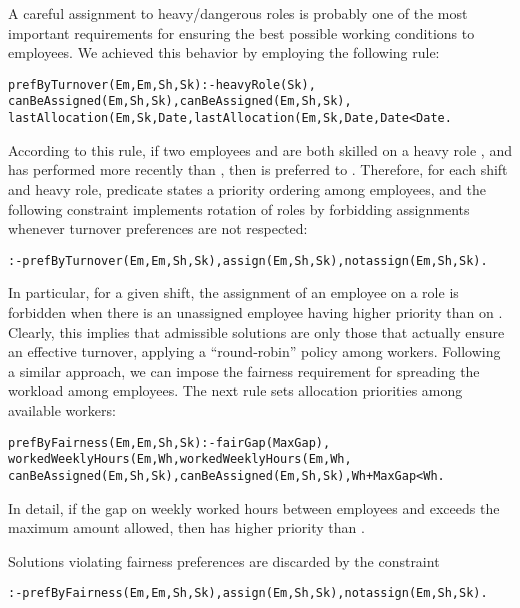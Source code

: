 \documentclass{tlp}
\begin{document}
A careful assignment to heavy/dangerous roles is probably one of the most important
requirements for ensuring the best possible working conditions to employees.
We achieved this behavior by employing the following rule:
\begin{alltt}\small
 prefByTurnover(Em,Em,Sh,Sk) :- heavyRole(Sk),
    canBeAssigned(Em,Sh,Sk), canBeAssigned(Em,Sh,Sk),
    lastAllocation(Em,Sk,Date, lastAllocation(Em,Sk,Date, Date < Date.
\end{alltt}\normalsize
According to this rule, if two employees  and  are both skilled
on a heavy role ,
and  has performed  more recently than ,
then  is preferred to .
Therefore, for each shift and heavy role, predicate  states a priority ordering
among employees, and the following constraint implements rotation of roles
by forbidding assignments whenever turnover preferences are not respected:
\begin{alltt}\small
 :- prefByTurnover(Em,Em,Sh,Sk), assign(Em,Sh,Sk), not assign(Em,Sh,Sk).
\end{alltt}\normalsize
In particular, for a given shift, the assignment of an employee  on a role  is forbidden
when there is an unassigned employee  having higher priority than  on .
Clearly, this implies that admissible solutions are only those that actually ensure an effective turnover,
applying a ``round-robin'' policy among workers.
Following a similar approach, we can impose the fairness requirement for
spreading the workload among employees.
The next rule sets allocation priorities among available workers:
\begin{alltt}\small
 prefByFairness(Em,Em,Sh,Sk) :- fairGap(MaxGap),
    workedWeeklyHours(Em,Wh, workedWeeklyHours(Em,Wh,
    canBeAssigned(Em,Sh,Sk), canBeAssigned(Em,Sh,Sk), Wh + MaxGap < Wh.
\end{alltt}\normalsize
In detail, if the gap on weekly worked hours between employees  and  exceeds
the maximum amount allowed, then  has higher priority than .


Solutions violating fairness preferences
are discarded by the constraint
\begin{alltt}\small
 :- prefByFairness(Em,Em,Sh,Sk), assign(Em,Sh,Sk), not assign(Em,Sh,Sk).
\end{alltt}\normalsize
\end{document}
